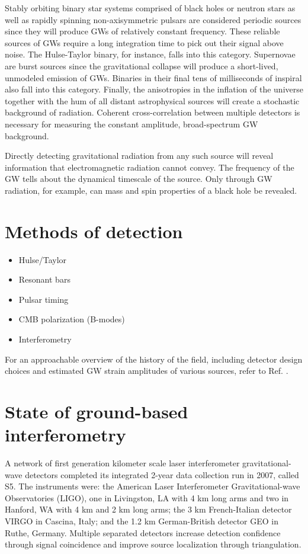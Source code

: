 Stably orbiting binary star systems comprised of black holes or
neutron stars as well as rapidly spinning non-axisymmetric pulsars are
considered periodic sources since they will produce GWs
of relatively constant frequency. These reliable sources of GWs
require a long integration time to pick out their signal above
noise. The Hulse-Taylor binary, for instance, falls into this
category. Supernovae are burst sources since the gravitational
collapse will produce a short-lived, unmodeled emission of
GWs. Binaries in their final tens of milliseconds of inspiral also
fall into this category. Finally, the anisotropies in the inflation of
the universe together with the hum of all distant astrophysical
sources will create a stochastic background of radiation. Coherent
cross-correlation between multiple detectors is necessary for
measuring the constant amplitude, broad-spectrum GW background.

Directly detecting gravitational radiation from any such source will
reveal information that electromagnetic radiation cannot convey. The
frequency of the GW tells about the dynamical timescale of the
source. Only through GW radiation, for example, can mass and spin
properties of a black hole be revealed.





\section{Methods of detection}
\begin{itemize}
\item Hulse/Taylor
\item Resonant bars
\item Pulsar timing
\item CMB polarization (B-modes)
\item Interferometry
\end{itemize}
For an approachable overview of the history of the field, including
detector design choices and estimated GW strain amplitudes of various
sources, refer to Ref. \cite{Linsay1983Study}.






\section{State of ground-based interferometry}
A network of first generation kilometer scale laser interferometer
gravitational-wave detectors completed its integrated 2-year data
collection run in 2007, called S5. The instruments were: the American
Laser Interferometer Gravitational-wave Observatories (LIGO)\cite{Abbott2009LIGO},
one in Livingston, LA with 4 km long arms and two in Hanford, WA with
4 km and 2 km long arms; the 3 km French-Italian detector
VIRGO\cite{Acernese2008Virgo} in Cascina, Italy; and the 1.2 km
German-British detector GEO\cite{Luck2006Status} in Ruthe, Germany. Multiple
separated detectors increase detection confidence through signal
coincidence and improve source localization through triangulation.

